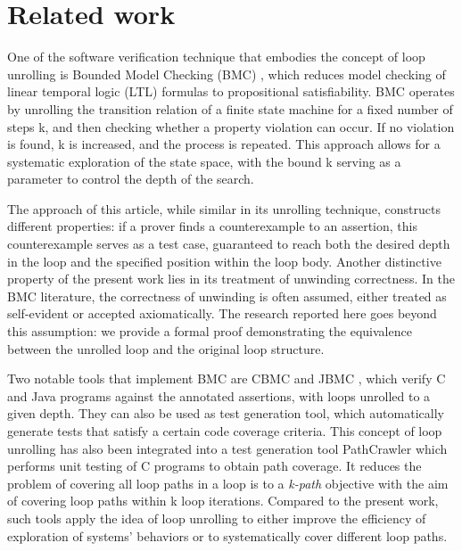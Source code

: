 \section{Related work}
\label{related}
\label{related_work}
One of the software verification technique that embodies the concept of loop unrolling is
Bounded Model Checking (BMC) \cite{Biere2003BoundedMC},  which reduces model checking of linear temporal logic (LTL) formulas to propositional satisfiability.  
BMC operates by unrolling the transition relation of a finite state machine for a fixed number of steps k, and then checking whether a property violation can occur. If no violation is found, k is increased, and the process is repeated. This approach allows for a systematic exploration of the state space, with the bound k serving as a parameter to control the depth of the search.

The approach of this article, while similar in its unrolling technique, constructs different properties: if a prover finds a counterexample to an assertion, this counterexample serves as a test case, guaranteed to reach both the desired depth in the loop and the specified position within the loop body.
Another distinctive property of the present work lies in its treatment of unwinding correctness. In the BMC literature, the correctness of unwinding is often assumed, either treated as self-evident or accepted axiomatically. The research reported here goes beyond this assumption: we provide a formal proof demonstrating the equivalence between the unrolled loop and the original loop structure.

Two notable tools that implement BMC are CBMC \cite{kroening2014cbmc} and JBMC \cite{brenguier2023jbmc}, which verify C and Java programs against the annotated  assertions, with loops unrolled to a given depth. They can also be used as test generation tool, which automatically generate tests that satisfy a certain code coverage criteria.
This concept of loop unrolling has also been integrated into a test generation tool PathCrawler \cite{williams2005pathcrawler, williams2021towards} which performs unit testing of C programs to obtain path coverage. It reduces the problem of covering all loop paths in a loop is to a \emph{k-path} objective with the aim of covering loop paths within k loop iterations. Compared to the present work, such tools apply the idea of loop unrolling to either improve the efficiency of exploration of systems' behaviors or to systematically cover different loop paths.


